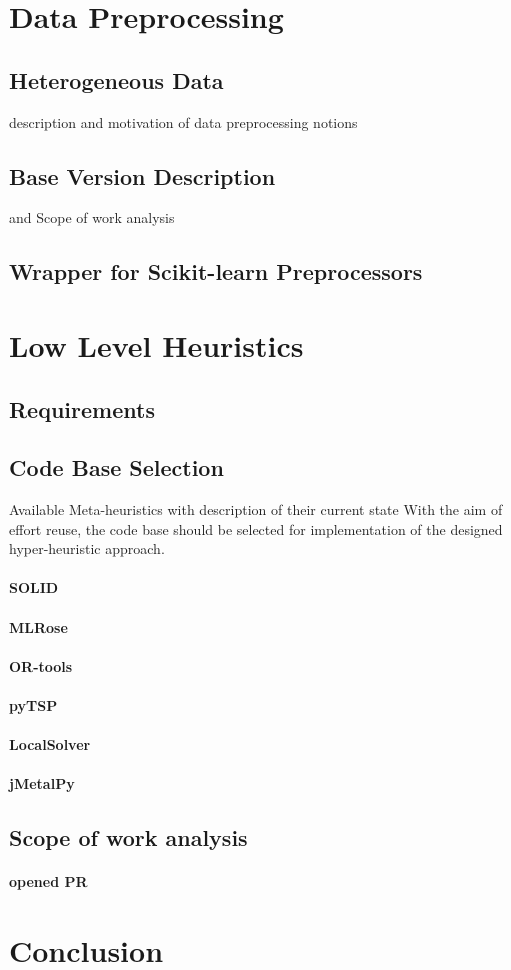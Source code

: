 \section{Data Preprocessing}
\subsection{Heterogeneous Data} description and motivation of data preprocessing notions

\subsection{Base Version Description} and Scope of work analysis
\subsection{Wrapper for Scikit-learn Preprocessors}


\section{Low Level Heuristics}\label{impl: LLH}

\subsection{Requirements}

\subsection{Code Base Selection}\label{implementation:llh code basis selection}
Available Meta-heuristics with description of their current state
With the aim of effort reuse, the code base should be selected for implementation of the designed hyper-heuristic approach.
\paragraph{SOLID}
\paragraph{MLRose}
\paragraph{OR-tools}
\paragraph{pyTSP}
\paragraph{LocalSolver}
\paragraph{jMetalPy}

\subsection{Scope of work analysis}
\paragraph{opened PR}

\section{Conclusion}
